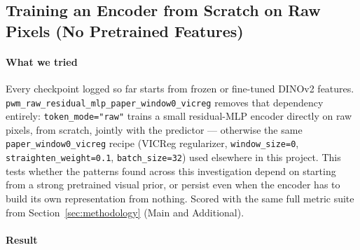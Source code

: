 \subsection{Training an Encoder from Scratch on Raw Pixels (No Pretrained Features)}
\label{exp:raw-pixel-from-scratch}

\paragraph{What we tried} Every checkpoint logged so far starts from frozen or
fine-tuned DINOv2 features. \texttt{pwm\_raw\_residual\_mlp\_paper\_window0\_vicreg}
removes that dependency entirely: \texttt{token\_mode="raw"} trains a small
residual-MLP encoder directly on raw pixels, from scratch, jointly with the predictor
--- otherwise the same \texttt{paper\_window0\_vicreg} recipe (VICReg regularizer,
\texttt{window\_size=0}, \texttt{straighten\_weight=0.1}, \texttt{batch\_size=32}) used
elsewhere in this project. This tests whether the patterns found across this
investigation depend on starting from a strong pretrained visual prior, or persist even
when the encoder has to build its own representation from nothing. Scored with the same
full metric suite from Section~\ref{sec:methodology} (Main and Additional).

\paragraph{Result}

